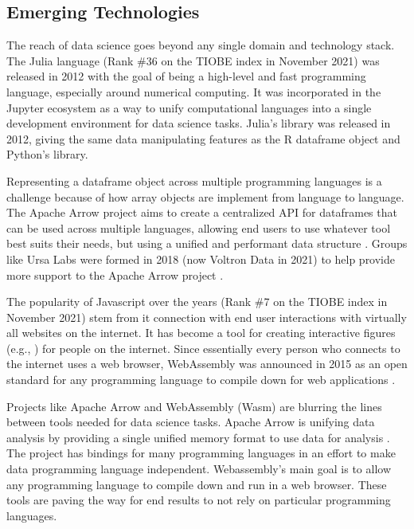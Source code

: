 \documentclass[010-intro.tex]{subfiles}
\begin{document}
\subsection{Emerging Technologies}

    The reach of data science goes beyond any single domain and technology stack.
    The Julia language (Rank \#36 on the TIOBE index in November 2021)
    was released in 2012 with the goal of being a high-level and fast programming language,
    especially around numerical computing.
    It was incorporated in the Jupyter ecosystem as a way to unify computational languages into a single
    development environment for data science tasks.
    Julia's  library was released in 2012, giving the same data manipulating
    features as the R dataframe object and Python's  library.
    
    Representing a dataframe object across multiple programming languages is a challenge because of
    how array objects are implement from language to language.
    The Apache Arrow project aims to create a centralized API for dataframes that can be used across multiple languages,
    allowing end users to use whatever tool best suits their needs,
    but using a unified and performant data structure
    \cite{ApacheArrow}.
    Groups like Ursa Labs were formed in 2018 (now Voltron Data in 2021) to help provide
    more support to the Apache Arrow project
    \cite{UrsaLabs, VoltronData}.
    
    The popularity of Javascript over the years (Rank \#7 on the TIOBE index in November 2021)
    stem from it connection with end user interactions with
    virtually all websites on the internet.
    It has become a tool for creating interactive figures (e.g., ) for people on the internet.
    Since essentially every person who connects to the internet uses a web browser,
    WebAssembly was announced in 2015 as an open standard for any programming language
    to compile down for web applications
    \cite{WebAssembly}.
    
    Projects like Apache Arrow and WebAssembly (Wasm) are blurring the lines between tools needed for data science tasks.
    Apache Arrow is unifying data analysis by providing a single unified memory format to use data for analysis
    \cite{theapachesoftwarefoundationApacheArrow2021}.
    The project has bindings for many programming languages in an effort to make data programming language independent.
    Webassembly's main goal is to allow any programming language to compile down and run in a web browser.
    These tools are paving the way for end results to not rely on particular programming languages.
\end{document}
